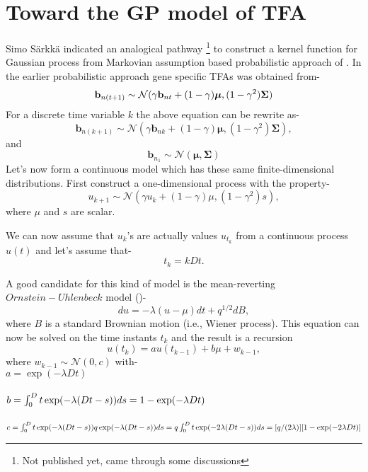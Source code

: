 \section{Toward the GP model of TFA}
Simo S\"arkk\"a indicated an analogical pathway \footnote{Not published yet, came through some discussions} to construct a kernel function for Gaussian process from Markovian assumption based probabilistic approach of \cite{Sanguinetti:2006}. In the earlier probabilistic approach gene specific TFAs was obtained from-
\begin{equation} \label{eq:tfa_SanG_updateCh4}
  \bold{b}_{n(t+1)} \sim \mathcal{N} (\gamma \bold{b}_{nt} + (1-\gamma)\boldsymbol{\mu},(1-\gamma^2)\bold{\Sigma})
\end{equation}
For a discrete time variable $k$ the above equation can be rewrite as-
\begin{equation}
\textbf{b}_{n(k+1)} \sim \mathcal{N}\left(\gamma \textbf{b}_{nk} + (1 - \gamma) \boldsymbol{\mu}, (1 - \gamma^2) \boldsymbol{\Sigma}\right),
\end{equation}
and
\begin{equation}
\textbf{b}_{n_1} \sim \mathcal{N}\left(\boldsymbol{\mu}, \boldsymbol{\Sigma}\right)
\end{equation}
Let's now form a continuous model which has these same finite-dimensional distributions. First construct a one-dimensional process with the property-
\begin{equation}
u_{k+1} \sim \mathcal{N}\left(\gamma u_k + \left(1 - \gamma\right) \mu, (1 - \gamma^2)s \right),
\end{equation}
where $\mu$ and $s$ are scalar.

We can now assume that $u_k$'s are actually values $u_{t_k}$ from a continuous process $u(t)$ and let's assume that- 
\begin{equation}
t_k = kDt.
\end{equation}

A good candidate for this kind of model is the mean-reverting $Ornstein-Uhlenbeck$ model 
(\cite{Ornstein_Uhlenbeck:1930})-
\begin{equation}
du = -\lambda \left(u - \mu\right) dt + q^{1/2} dB,
\end{equation}
where $B$ is a standard Brownian motion (i.e., Wiener process). This equation can now be solved on the time instants $t_k$ and the result is a recursion
\begin{equation}
u(t_k) = a u(t_{k-1}) + b \mu + w_{k-1},
\end{equation}
where $w_{k-1} \sim \mathcal{N}(0,c)$ with-\\
$a = \exp(-\lambda Dt)$\\~\\
$b = \int_0^Dt \exp(-\lambda (Dt-s)) ds\\
 = 1 - \exp(-\lambda Dt)$\\~\\
$c = \int_0^Dt \exp(-\lambda (Dt-s)) q \exp(-\lambda (Dt-s)) ds \\
= q \int_0^Dt \exp(-2 \lambda (Dt-s)) ds\\
= [q / (2 \lambda)] [1 - \exp(-2 \lambda Dt)]$

